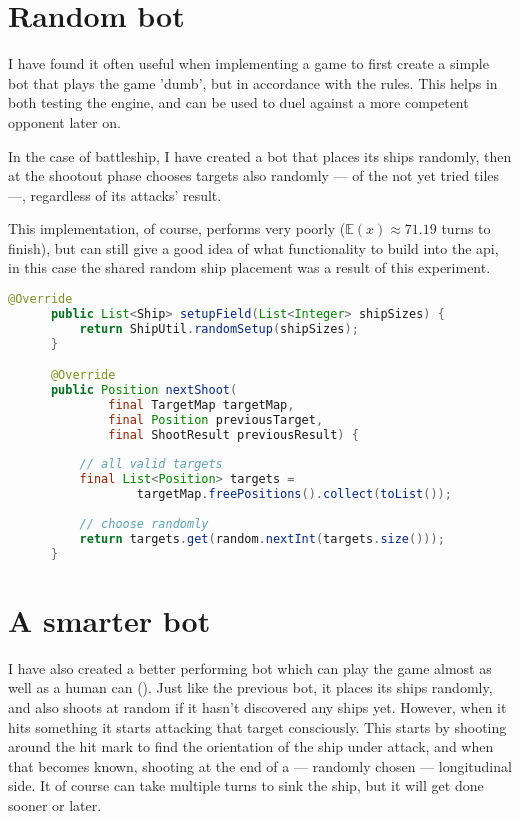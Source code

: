 		\section{Random bot}
		
		I have found it often useful when implementing a game to first create a simple bot that plays the game 'dumb', but in accordance with the rules. This helps in both testing the engine, and can be used to duel against a more competent opponent later on.
		
		In the case of battleship, I have created a bot that places its ships randomly, then at the shootout phase chooses targets also randomly --- of the not yet tried tiles ---, regardless of its attacks' result.
		
		This implementation, of course, performs very poorly ($\mathbb{E}(x) \approx 71.19$ turns to finish), but can still give a good idea of what functionality to build into the api, in this case the shared random ship placement was a result of this experiment.
		
		\begin{center}
		\begin{minipage}{13cm}
		\begin{lstlisting}[language=Java, title={\code{RandomBot.java}}]
	  @Override
      public List<Ship> setupField(List<Integer> shipSizes) {
          return ShipUtil.randomSetup(shipSizes);
      }

      @Override
      public Position nextShoot(
    	  	  final TargetMap targetMap,
    		  final Position previousTarget,
    		  final ShootResult previousResult) {
    		
    	  // all valid targets
          final List<Position> targets =
        		  targetMap.freePositions().collect(toList());
        		
          // choose randomly
          return targets.get(random.nextInt(targets.size()));
      }
		\end{lstlisting}
			\end{minipage}
		\end{center}
		\section{A smarter bot}

		I have also created a better performing bot which can play the game almost as well as a human can (). Just like the previous bot, it places its ships randomly, and also shoots at random if it hasn't discovered any ships yet. However, when it hits something it starts attacking that target consciously. This starts by shooting around the hit mark to find the orientation of the ship under attack, and when that becomes known, shooting at the end of a --- randomly chosen --- longitudinal side. It of course can take multiple turns to sink the ship, but it will get done sooner or later.
		
